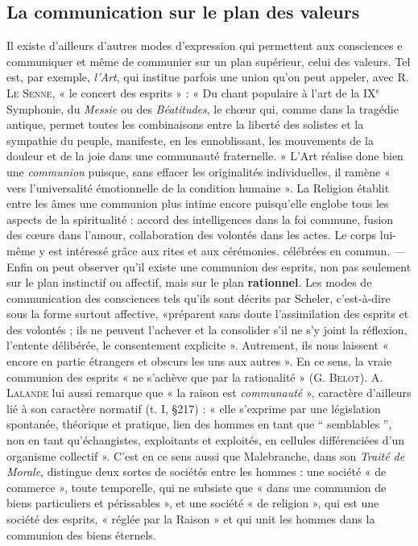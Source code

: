 \subsection{La communication sur le plan des valeurs}
Il existe
d’ailleurs d’autres modes d'expression qui permettent aux consciences
e communiquer et même de communier sur un plan supérieur, celui
des valeurs. Tel est, par exemple, {\it l'Art}, qui institue parfois une union
qu’on peut appeler, avec \textsc{R. Le Senne}, « le concert des esprits » :
« Du chant populaire à l’art de la {\footnotesize IX}$^\text{e}$ Symphonie, du {\it Messie} ou des
{\it Béatitudes}, le chœur qui, comme dans la tragédie antique, permet
toutes les combinaisons entre la liberté des solistes et la sympathie
du peuple, manifeste, en les ennoblissant, les mouvements de la douleur
et de la joie dans une communauté fraternelle. » L'Art réalise
done bien une {\it communion} puisque, sans effacer les originalités individuelles,
il ramène « vers l’universalité émotionnelle de la condition
humaine ». La Religion établit entre les âmes une communion plus
intime encore puisqu'elle englobe tous les aspects de la spiritualité :
accord des intelligences dans la foi commune, fusion des cœurs dans
l'amour, collaboration des volontés dans les actes. Le corps lui-même
y est intéressé grâce aux rites et aux cérémonies. célébrées en commun.
— Enfin on peut observer qu’il existe une communion des esprits, non
pas seulement sur le plan instinctif ou affectif, mais sur le plan
{\bf rationnel}. Les modes de communication des consciences tels qu’ils
sont décrits par Scheler, c’est-à-dire sous la forme surtout affective,
«préparent sans doute l’assimilation des esprits et des volontés ;
ils ne peuvent l’achever et la consolider s'il ne s’y joint la réflexion,
l'entente délibérée, le consentement explicite ». Autrement, ils nous
laissent « encore en partie étrangers et obscurs les uns aux autres ».
En ce sens, la vraie communion des esprits « ne s’achève que par la
rationalité » (\textsc{G. Belot}). \textsc{A. Lalande} lui aussi remarque que « la
raison est {\it communauté} », caractère d’ailleurs lié à son caractère
normatif (t. I, \S 217) : « elle s'exprime par une législation spontanée,
théorique et pratique, lien des hommes en tant que “ semblables ”,
non en tant qu’échangistes, exploitants et exploités, en cellules différenciées
d’un organisme collectif ». C’est en ce sens aussi que Malebranche,
dans son {\it Traité de Morale}, distingue deux sortes de sociétés
entre les hommes : une société « de commerce », toute temporelle,
qui ne subsiste que « dans une communion de biens particuliers et
périssables », et une société « de religion », qui est une société des
esprits, « réglée par la Raison » et qui unit les hommes dans la communion
des biens éternels.

